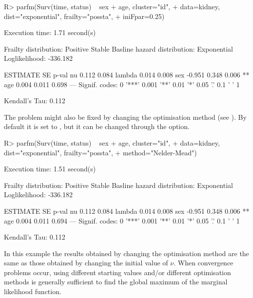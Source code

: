 \begin{CodeChunk}
\begin{CodeInput}
R> parfm(Surv(time, status) ~ sex + age, cluster="id", 
+        data=kidney, dist="exponential", frailty="possta", 
+        iniFpar=0.25)
\end{CodeInput}
\begin{CodeOutput}
Execution time: 1.71 second(s)

Frailty distribution: Positive Stable 
Basline hazard distribution: Exponential 
Loglikelihood: -336.182 

       ESTIMATE SE    p-val    
nu      0.112   0.084          
lambda  0.014   0.008          
sex    -0.951   0.348 0.006 ** 
age     0.004   0.011 0.698    
---
Signif. codes: 0 '***' 0.001 '**' 0.01 '*' 0.05 '.' 0.1 ' ' 1

Kendall's Tau: 0.112 
\end{CodeOutput}
\end{CodeChunk}

The problem might also be fixed by changing the optimisation method (see ).
By default it is set to , 
  but it can be changed through the  option.

\begin{CodeChunk}
\begin{CodeInput}
R> parfm(Surv(time, status) ~ sex + age, cluster="id", 
+        data=kidney, dist="exponential", frailty="possta", 
+        method="Nelder-Mead")
\end{CodeInput}
\begin{CodeOutput}
Execution time: 1.51 second(s)

Frailty distribution: Positive Stable 
Basline hazard distribution: Exponential 
Loglikelihood: -336.182 

       ESTIMATE SE    p-val    
nu      0.112   0.084          
lambda  0.014   0.008          
sex    -0.951   0.348 0.006 ** 
age     0.004   0.011 0.694    
---
Signif. codes: 0 '***' 0.001 '**' 0.01 '*' 0.05 '.' 0.1 ' ' 1

Kendall's Tau: 0.112 
\end{CodeOutput}
\end{CodeChunk}

In this example the results obtained by changing the optimisation method are the same
  as those obtained by changing the initial value of $\nu$.
When convergence problems occur, using different starting values and/or different optimisation methods
  is generally sufficient to find the global maximum of the marginal likelihood function.


